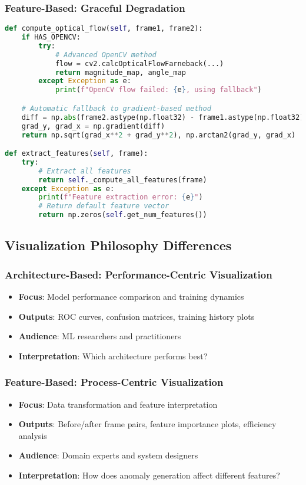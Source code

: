 \documentclass[11pt,a4paper]{article}
\begin{document}
\subsubsection{Feature-Based: Graceful Degradation}
\begin{lstlisting}[language=Python, caption=Feature-Based Error Handling]
def compute_optical_flow(self, frame1, frame2):
    if HAS_OPENCV:
        try:
            # Advanced OpenCV method
            flow = cv2.calcOpticalFlowFarneback(...)
            return magnitude_map, angle_map
        except Exception as e:
            print(f"OpenCV flow failed: {e}, using fallback")

    # Automatic fallback to gradient-based method
    diff = np.abs(frame2.astype(np.float32) - frame1.astype(np.float32))
    grad_y, grad_x = np.gradient(diff)
    return np.sqrt(grad_x**2 + grad_y**2), np.arctan2(grad_y, grad_x)

def extract_features(self, frame):
    try:
        # Extract all features
        return self._compute_all_features(frame)
    except Exception as e:
        print(f"Feature extraction error: {e}")
        # Return default feature vector
        return np.zeros(self.get_num_features())
\end{lstlisting}

\subsection{Visualization Philosophy Differences}

\subsubsection{Architecture-Based: Performance-Centric Visualization}
\begin{itemize}
    \item \textbf{Focus}: Model performance comparison and training dynamics
    \item \textbf{Outputs}: ROC curves, confusion matrices, training history plots
    \item \textbf{Audience}: ML researchers and practitioners
    \item \textbf{Interpretation}: Which architecture performs best?
\end{itemize}

\subsubsection{Feature-Based: Process-Centric Visualization}
\begin{itemize}
    \item \textbf{Focus}: Data transformation and feature interpretation
    \item \textbf{Outputs}: Before/after frame pairs, feature importance plots, efficiency analysis
    \item \textbf{Audience}: Domain experts and system designers
    \item \textbf{Interpretation}: How does anomaly generation affect different features?
\end{itemize}
\end{document}
